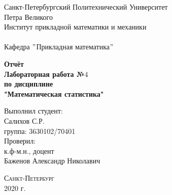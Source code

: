\documentclass[a4]{article}
\begin{document}
	\def\contentsname{\LARGE{Содержание}}
	\thispagestyle{empty}
	\begin{center} 
		\vspace{2cm} 
		{\Large \sc Санкт-Петербургский Политехнический Университет}\\
		\vspace{2mm}
		{\Large\sc Петра Великого}\\
		\vspace{1cm}
		{\large \sc Институт прикладной математики и механики\\ 
			\vspace{0.5mm}
			\textsc{}}\\ 
		\vspace{0.5mm}
		{\large\sc Кафедра $"$Прикладная математика$"$}\\
		\vspace{15mm}
		
		
		{\sc \textbf{Отчёт\\
			Лабораторная работа №$4$\\
			по дисциплине\\
			"Математическая статистика"}
			\vspace{6mm}
			
		}
		\vspace*{2mm}
		
		
		\begin{flushleft}
			\vspace{4cm}
			\sc Выполнил студент:\\
			\sc Салихов С.Р.\\
			\sc группа: 3630102/70401\\
			\vspace{1cm}
			\sc Проверил:\\
			\sc к.ф-м.н., доцент\\
			\sc Баженов Александр Николавич
			\vspace{20mm}
		\end{flushleft}
	\end{center} 
	\begin{center}
		\vfill {\large\textsc{Санкт-Петербург}}\\ 
		2020 г.
	\end{center}
	
	\newpage
	\pagestyle{plain}
	
	
	
\end{document}
